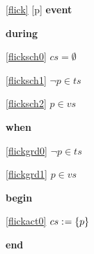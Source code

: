 \noindent \ref{flick} [p] \textbf{event}
\begin{block}
  \item   \textbf{during}
  \begin{block}
  \item[ \eqref{flicksch0} ]$cs = \emptyset$ %
  \item[ \eqref{flicksch1} ]$\neg p \in ts $ %
  \item[ \eqref{flicksch2} ]$p \in vs$ %
  \end{block}
  \item   \textbf{when}
  \begin{block}
  \item[ \eqref{flickgrd0} ]$\neg p \in ts $ %
  \item[ \eqref{flickgrd1} ]$p \in vs$ %
  \end{block}
  \item   \textbf{begin}
  \begin{block}
  \item[ \eqref{flickact0} ]$cs \mathrel{:\mkern1mu=} \{ p \} $ %
  \end{block}
  \item   \textbf{end} \\
\end{block}
